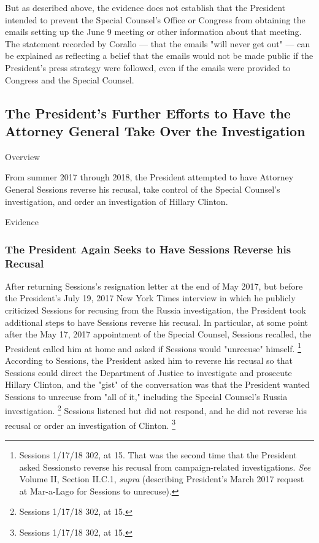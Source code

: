 {But as described above, the evidence does not establish that the President intended to prevent the Special Counsel's Office or Congress from obtaining the emails setting up the June 9 meeting or other information about that meeting.
The statement recorded by Corallo — that the emails "will never get out" — can be explained as reflecting a belief that the emails would not be made public if the President's press strategy were followed, even if the emails were provided to Congress and the Special Counsel.

\subsection{The President's Further Efforts to Have the Attorney General Take Over the Investigation}

Overview

From summer 2017 through 2018, the President attempted to have Attorney General Sessions reverse his recusal, take control of the Special Counsel's investigation, and order an investigation of Hillary Clinton.

Evidence

\subsubsection{The President Again Seeks to Have Sessions Reverse his Recusal}

After returning Sessions's resignation letter at the end of May 2017, but before the President's July 19, 2017 New York Times interview in which he publicly criticized Sessions for recusing from the Russia investigation, the President took additional steps to have Sessions reverse his recusal.
In particular, at some point after the May 17, 2017 appointment of the Special Counsel, Sessions recalled, the President called him at home and asked if Sessions would "unrecuse" himself.%
\footnote{Sessions 1/17/18 302, at 15.
That was the second time that the President asked Sessionsto reverse his recusal from campaign-related investigations.
\textit{See} Volume II, Section II.C.1, \textit{supra} (describing President’s March 2017 request at Mar-a-Lago for Sessions to unrecuse).
}
According to Sessions, the President asked him to reverse his recusal so that Sessions could direct the Department of Justice to investigate and prosecute Hillary Clinton, and the "gist" of the conversation was that the President wanted Sessions to unrecuse from "all of it," including the Special Counsel's Russia investigation.%
\footnote{Sessions 1/17/18 302, at 15.}
Sessions listened but did not respond, and he did not reverse his recusal or order an investigation of Clinton.%
\footnote{Sessions 1/17/18 302, at 15.}

}
